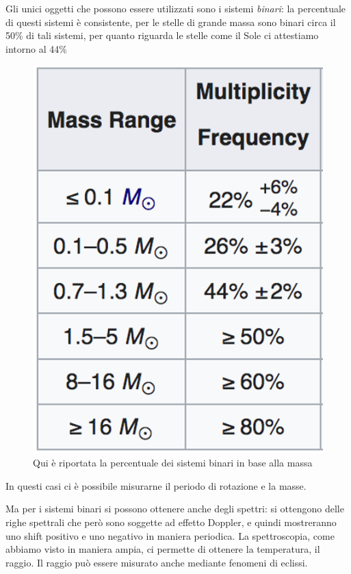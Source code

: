 \documentclass[a4paper,11pt]{article}
\begin{document}
Gli unici oggetti che possono essere utilizzati sono i sistemi \textit{binari}: la percentuale di questi sistemi è consistente, per le stelle di grande massa sono binari circa il 50\% di tali sistemi, per quanto riguarda le stelle come il Sole ci attestiamo intorno al 44\%

\begin{figure}[h!]
    \centering
    \includegraphics[scale=0.3]{percbinarie.png}
    \caption{Qui è riportata la percentuale dei sistemi binari in base alla massa}
\end{figure}
In questi casi ci è possibile misurarne il periodo di rotazione e la masse.

Ma per i sistemi binari si possono ottenere anche degli spettri: si ottengono delle righe spettrali che però sono soggette ad effetto Doppler, e quindi mostreranno uno shift positivo e uno negativo in maniera periodica. La spettroscopia, come abbiamo visto in maniera ampia, ci permette di ottenere la temperatura, il raggio. Il raggio può essere misurato anche mediante fenomeni di eclissi.
\end{document}

